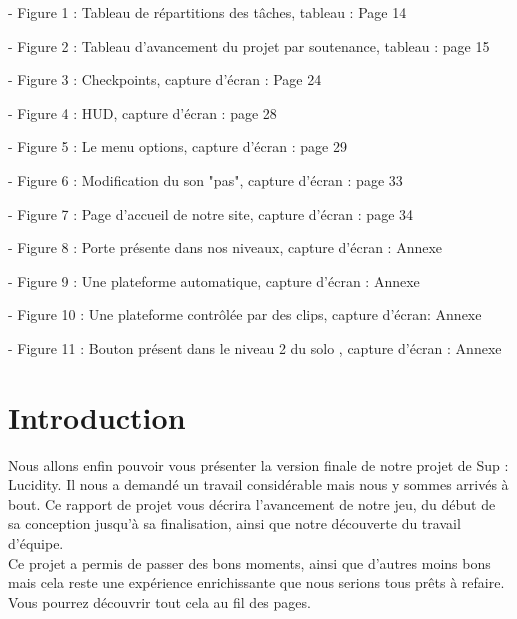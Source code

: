 \documentclass[a4paper , 12pt]{article}
\begin{document}
\quad

- Figure 1 : Tableau de répartitions des tâches, tableau : Page 14

\quad

- Figure 2 : Tableau d'avancement du projet par soutenance, tableau : page 15

\quad

- Figure 3 : Checkpoints, capture d'écran : Page 24

\quad

- Figure 4 : HUD, capture d'écran : page 28

\quad

- Figure 5 : Le menu options, capture d'écran : page 29

\quad

- Figure 6 : Modification du son "pas", capture d'écran : page 33

\quad

- Figure 7 : Page d'accueil de notre site, capture d'écran : page 34

\quad

- Figure 8 : Porte présente dans nos niveaux, capture d'écran : Annexe

\quad

 - Figure 9 : Une plateforme automatique, capture d'écran : Annexe

\quad

- Figure 10 : Une plateforme contrôlée par des clips, capture d'écran: Annexe

\quad

- Figure 11 : Bouton présent dans le niveau 2 du solo , capture d'écran : Annexe



\newpage



\section{Introduction}

\quad

Nous allons enfin pouvoir vous présenter la version finale de notre projet de Sup : Lucidity. Il nous a demandé un travail considérable mais nous y sommes arrivés à bout. Ce rapport de projet vous décrira l’avancement de notre jeu, du début de sa conception jusqu’à sa finalisation, ainsi que notre découverte du travail d’équipe.\\

    Ce projet a permis de passer des bons moments, ainsi que d’autres moins bons mais cela reste une expérience enrichissante que nous serions tous prêts à refaire. Vous pourrez découvrir tout cela au fil des pages.\\
\end{document}
